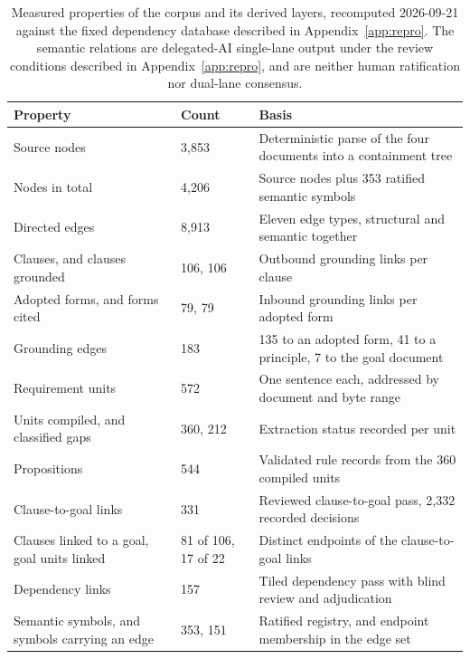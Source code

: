 \begin{table}[t]
\centering
\caption{Measured properties of the corpus and its derived layers, recomputed 2026-09-21 against the fixed dependency database described in Appendix~\ref{app:repro}. The semantic relations are delegated-AI single-lane output under the review conditions described in Appendix~\ref{app:repro}, and are neither human ratification nor dual-lane consensus.}
\label{tab:corpus}
\begin{tabular}{p{2.1in}p{0.8in}p{3.5in}}
\toprule
Property & Count & Basis \\
\midrule
Source nodes & 3{,}853 & Deterministic parse of the four documents into a containment tree \\
\addlinespace
Nodes in total & 4{,}206 & Source nodes plus 353 ratified semantic symbols \\
\addlinespace
Directed edges & 8{,}913 & Eleven edge types, structural and semantic together \\
\addlinespace
Clauses, and clauses grounded & 106, 106 & Outbound grounding links per clause \\
\addlinespace
Adopted forms, and forms cited & 79, 79 & Inbound grounding links per adopted form \\
\addlinespace
Grounding edges & 183 & 135 to an adopted form, 41 to a principle, 7 to the goal document \\
\addlinespace
Requirement units & 572 & One sentence each, addressed by document and byte range \\
\addlinespace
Units compiled, and classified gaps & 360, 212 & Extraction status recorded per unit \\
\addlinespace
Propositions & 544 & Validated rule records from the 360 compiled units \\
\addlinespace
Clause-to-goal links & 331 & Reviewed clause-to-goal pass, 2{,}332 recorded decisions \\
\addlinespace
Clauses linked to a goal, goal units linked & 81 of 106, 17 of 22 & Distinct endpoints of the clause-to-goal links \\
\addlinespace
Dependency links & 157 & Tiled dependency pass with blind review and adjudication \\
\addlinespace
Semantic symbols, and symbols carrying an edge & 353, 151 & Ratified registry, and endpoint membership in the edge set \\
\bottomrule
\end{tabular}
\end{table}

